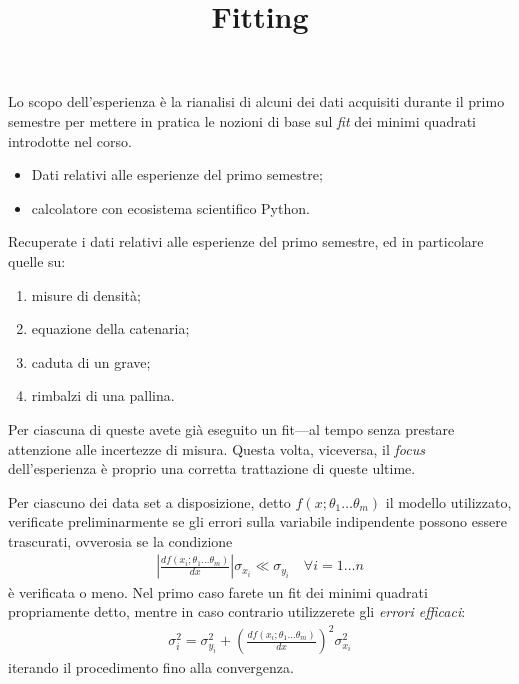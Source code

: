 \documentclass{lab1-article}
\title{Fitting}
\begin{document}
\begin{article}

\maketitle

\secintro


Lo scopo dell'esperienza \`e la rianalisi di alcuni dei dati acquisiti durante
il primo semestre per mettere in pratica le nozioni di base sul \emph{fit} dei
minimi quadrati introdotte nel corso.

\secmaterialsdad

\begin{itemize}
\item Dati relativi alle esperienze del primo semestre;
\item calcolatore con ecosistema scientifico Python.
\end{itemize}


\secmeasurements

Recuperate i dati relativi alle esperienze del primo semestre, ed in particolare
quelle su:
\begin{enumerate}
  \item misure di densit\`a;
  \item equazione della catenaria;
  \item caduta di un grave;
  \item rimbalzi di una pallina.
\end{enumerate}
Per ciascuna di queste avete gi\`a eseguito un fit---al tempo senza prestare
attenzione alle incertezze di misura. Questa volta, viceversa, il \emph{focus}
dell'esperienza \`e proprio una corretta trattazione di queste ultime.


Per ciascuno dei data set a disposizione, detto $f(x; \theta_1 \ldots \theta_m)$
il modello utilizzato, verificate preliminarmente se gli errori sulla variabile
indipendente possono essere trascurati, ovverosia se la condizione
\begin{align}\label{eq:errorex}
  \left| \frac{df(x_i; \theta_1 \ldots \theta_m)}{dx} \right| \sigma_{x_i} \ll
  \sigma_{y_i} \quad \forall i = 1 \ldots n
\end{align}
\`e verificata o meno. Nel primo caso farete un fit dei minimi quadrati
propriamente detto, mentre in caso contrario utilizzerete gli
\emph{errori efficaci}:
\begin{align}\label{eq:errori_efficaci}
  \sigma_i^2 = \sigma_{y_i}^2 +
  \left( \frac{df(x_i; \theta_1 \ldots \theta_m)}{dx} \right)^2 \sigma_{x_i}^2
\end{align}
iterando il procedimento fino alla convergenza.


\end{article}
\end{document}
